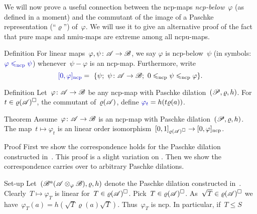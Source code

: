 \documentclass[b]{subfiles}
\begin{document}
\begin{parsec}%
\begin{point}%
We will now prove a useful connection between
    the ncp-maps \emph{ncp-below}~$\varphi$ (as defined in a moment)
    and the commutant of the image
    of a Paschke representation (``$\varrho$'') of~$\varphi$.
We will use it to give an alternative proof
    of the fact that pure maps and nmiu-maps
    are extreme among all ncpu-maps.
\end{point}
\begin{point}{Definition}%
For linear  maps~$\varphi, \psi\colon \mathscr{A} \to \mathscr{B}$,
    we say $\varphi$ is ncp-below~$\psi$
    (in symbols:~$\Define{\varphi \mathrel{\leq_\ncp} \psi}$\index{$\leq_\ncp$})
    whenever~$\psi - \varphi$ is an ncp-map.
    Furthermore, write
    \begin{equation*}
        \Define{[0,\varphi]_\ncp}\index{$[0,\varphi]_\ncp$} =\  
        \{\psi; \ \psi \colon \scrA \to \scrB;
            \ 0 \leq_\ncp\psi \leq_\ncp \varphi \}.
    \end{equation*}
\end{point}
\begin{point}{Definition}%
    Let~$\varphi\colon \mathscr{A} \to \mathscr{B}$ be any ncp-map with Paschke
        dilation~$(\mathscr{P}, \varrho, h)$.
        For~$t \in \varrho(\mathscr{A})^\square$, the commutant of~$\varrho(\mathscr{A})$,
        define $\Define{\varphi_t}\index{$\varphi_t$} = h(t \varrho(a))$.
\end{point}
\begin{point}[paschke-correspondence]{Theorem}%
Assume~$\varphi\colon \mathscr{A} \to \mathscr{B}$ is an ncp-map
    with Paschke dilation~$(\mathscr{P}, \varrho, h)$.
The map~$t \mapsto \varphi_t$ is an linear
order isomorphism~$[0,1]_{\varrho(\mathscr{A})^\square} \to [0,\varphi]_{\mathrm{ncp}}$.
\begin{point}{Proof}
First we show the correspondence holds
    for the Paschke dilation constructed in~.
This proof is a slight variation on \cite[Prop.~5.4]{paschke}.
Then we show the correspondence carries over to arbitrary Paschke dilations.
\begin{point}{Set-up}%
Let~$(\mathscr{B}^a(\mathscr{A} \otimes_\varphi \mathscr{B}), \varrho, h)$
    denote the Paschke dilation constructed in~.
Clearly~$T \mapsto \varphi_T$ is linear
    for~$T \in \varrho(\mathscr{A})^\square$.
Pick~$T \in \varrho(\mathscr{A})^\square$.
As~$\sqrt{T} \in \varrho(\mathscr{A})^\square$
    we have~$\varphi_T(a) = h(\sqrt{T} \varrho(a)\sqrt{T})$.
    Thus~$\varphi_T$ is ncp.
In particular, if~$T \leq S$

\end{point}
\end{point}
\end{point}
\end{parsec}
\end{document}
